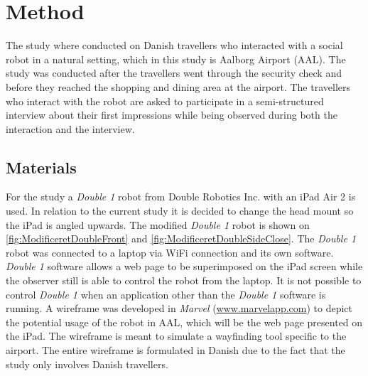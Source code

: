 \section{Method}
\label{Method}
%
The study where conducted on Danish travellers who interacted with a social robot in a natural setting, which in this study is Aalborg Airport (AAL). The study was conducted after the travellers went through the security check and before they reached the shopping and dining area at the airport. The travellers who interact with the robot are asked to participate in a semi-structured interview about their first impressions while being observed during both the interaction and the interview. 

\subsection{Materials}
For the study a \textit{Double 1} robot from Double Robotics Inc. with an iPad Air 2 is used. In relation to the current study it is decided to change the head mount so the iPad is angled upwards. The modified \textit{Double 1} robot is shown on \autoref{fig:ModificeretDoubleFront} and \autoref{fig:ModificeretDoubleSideClose}. The \textit{Double 1} robot was connected to a laptop via WiFi connection and its own software. \textit{Double 1} software allows a web page to be superimposed on the iPad screen while the observer still is able to control the robot from the laptop. It is not possible to control \textit{Double 1} when an application other than the \textit{Double 1} software is running. A wireframe was developed in \textit{Marvel} (\url{www.marvelapp.com}) to depict the potential usage of the robot in AAL, which will be the web page presented on the iPad. The wireframe is meant to simulate a wayfinding tool specific to the airport. The entire wireframe is formulated in Danish due to the fact that the study only involves Danish travellers.
%
